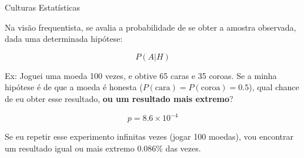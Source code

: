 \documentclass{beamer}\usepackage[]{graphicx}\usepackage[]{color}
\begin{document}
\begin{frame}{Culturas Estatísticas}

\begin{small}

Na visão frequentista, se avalia a probabilidade de se obter a amostra observada, dada uma determinada hipótese:

\begin{equation*}
P(A|H)
\end{equation*}

\alert{Ex:} Joguei uma moeda 100 vezes, e obtive 65 caras e 35 coroas. Se a minha hipótese é de que a moeda é honesta ($P(\text{cara}) = P(\text{coroa}) = 0.5$), qual chance de eu obter esse resultado, \textbf{ou um resultado mais extremo}?

\begin{equation*}
p =\ensuremath{8.6\times 10^{-4}}
\end{equation*}

Se eu repetir esse experimento infinitas vezes (jogar 100 moedas), vou encontrar um resultado igual ou mais extremo 0.086\% das vezes.

\end{small} 
 
\end{frame}

\end{document}
